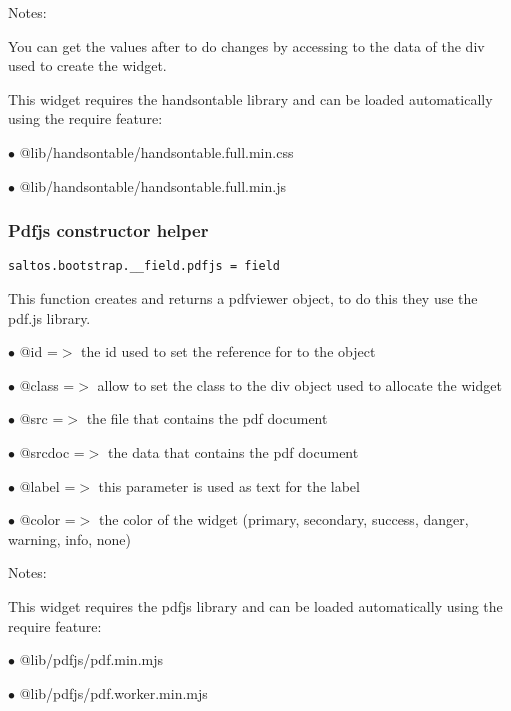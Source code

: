 \documentclass[a4paper]{article}
\begin{document}
Notes:

You can get the values after to do changes by accessing to the data of the div used to create
the widget.

This widget requires the handsontable library and can be loaded automatically using the require
feature:

\begin{compactitem}
\item[\color{myblue}$\bullet$] @lib/handsontable/handsontable.full.min.css
\item[\color{myblue}$\bullet$] @lib/handsontable/handsontable.full.min.js
\end{compactitem}

\hypertarget{toc632}{}
\subsubsection{Pdfjs constructor helper}

\begin{lstlisting}
saltos.bootstrap.__field.pdfjs = field
\end{lstlisting}

This function creates and returns a pdfviewer object, to do this they use the pdf.js library.

\begin{compactitem}
\item[\color{myblue}$\bullet$] @id     =$>$ the id used to set the reference for to the object
\item[\color{myblue}$\bullet$] @class  =$>$ allow to set the class to the div object used to allocate the widget
\item[\color{myblue}$\bullet$] @src    =$>$ the file that contains the pdf document
\item[\color{myblue}$\bullet$] @srcdoc =$>$ the data that contains the pdf document
\item[\color{myblue}$\bullet$] @label  =$>$ this parameter is used as text for the label
\item[\color{myblue}$\bullet$] @color  =$>$ the color of the widget (primary, secondary, success, danger, warning, info, none)
\end{compactitem}

Notes:

This widget requires the pdfjs library and can be loaded automatically using the require
feature:

\begin{compactitem}
\item[\color{myblue}$\bullet$] @lib/pdfjs/pdf.min.mjs
\item[\color{myblue}$\bullet$] @lib/pdfjs/pdf.worker.min.mjs
\end{compactitem}
\end{document}
